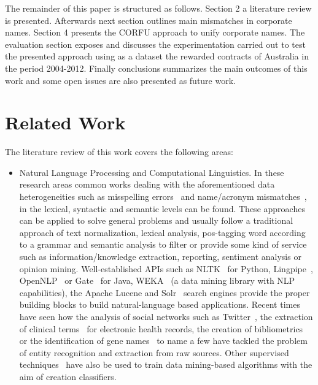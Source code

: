 \documentclass{llncs}
\begin{document}
The remainder of this paper is structured as follows. Section 2 a literature review is presented. Afterwards next section outlines main mismatches in corporate names. Section 4 presents 
the CORFU approach to unify corporate names. The evaluation section exposes and discusses the experimentation carried out to test the presented approach using as a dataset the rewarded 
contracts of Australia in the period 2004-2012. Finally conclusions summarizes the main outcomes of this work 
and some open issues are also presented as future work.


\section{Related Work}
The literature review of this work covers the following areas:
\begin{itemize}
 \item Natural Language Processing and Computational Linguistics. In these research areas common works dealing with the aforementioned data heterogeneities 
   such as misspelling errors~\cite{NorvigSpelling,StanfordSpelling} and name/acronym mismatches~\cite{Yeates99automaticextraction,Ratinov:2004:AES:1025132.1026366}, 
  in the lexical, syntactic and semantic levels can be found. These approaches can be applied to solve general problems and usually follow a 
  traditional approach of text normalization, lexical analysis, pos-tagging word according to a grammar and semantic analysis to filter or 
  provide some kind of service such as information/knowledge extraction, reporting, sentiment analysis or opinion mining. 
  Well-established APIs such as NLTK~\cite{LoperBird02} for Python, Lingpipe~\cite{Lingpipe}, OpenNLP~\cite{OpenNLP} or Gate~\cite{Gate} for Java, WEKA~\cite{read12:_scalab} 
  (a data mining library with NLP capabilities), the Apache Lucene and Solr~\cite{rafa2011apache} search engines provide the proper building blocks to build natural-language based applications. 
  Recent times have seen how the analysis of social networks such as Twitter~\cite{Li:2012:TNE:2348283.2348380,Gimpel:2011:PTT:2002736.2002747}, the extraction of 
  clinical terms~\cite{Wang:2009:ARN:1667884.1667888} for electronic health records, the creation of bibliometrics~\cite{Galvez2006,Morillo:2013:TAA:2424697.2424727} or 
  the identification of gene names~\cite{Krauthammer:2004:TIB:1053007.1053018,Galvez2012} to name a few have tackled the problem of entity recognition and extraction from raw sources. 
  Other supervised techniques~\cite{Bohn:2006:PHD} have also be used to train data mining-based algorithms with the aim of creation classifiers.
 

\end{itemize}
\end{document}
